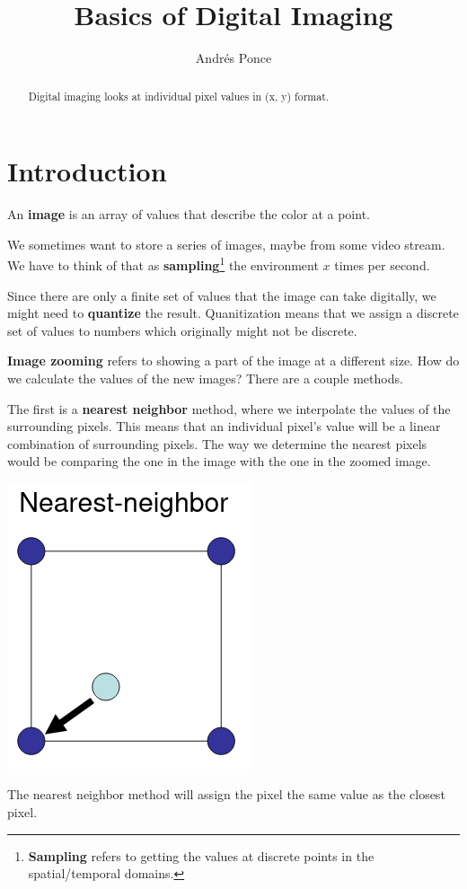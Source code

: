\documentclass{tufte-handout}
\title{Basics of Digital Imaging}
\author{Andr\'es Ponce}
\begin{document}
\maketitle
\begin{abstract}
	Digital imaging looks at individual pixel values in (x, y) format.
\end{abstract}

\section{Introduction}
An \textbf{image} is an array of values that describe the color at a point.

We sometimes want to store a series of images, maybe from some video stream.
We have to think of that as \textbf{sampling}\footnote{\textbf{Sampling} refers to 
getting the values at discrete points in the spatial/temporal domains.} 
the environment $x$ times per second.

Since there are only a finite set of values that the image can take digitally,
we might need to \textbf{quantize} the result. Quanitization means that we assign
a discrete set of values to numbers which originally might not be discrete.

\textbf{Image zooming} refers to showing a part of the image at a different size.
How do we calculate the values of the new images? There are a couple methods.

The first is a \textbf{nearest neighbor} method, where we interpolate the values 
of the surrounding pixels. This means that an individual pixel's value will be 
a linear combination of surrounding pixels. The way we determine the nearest 
pixels would be comparing the one in the image with the one in the zoomed 
image.

\begin{marginfigure}
	\includegraphics[scale=0.3]{nn}
	\caption{The nearest neighbor method will assign the pixel the same value
			as the closest pixel.}
\end{marginfigure}
\end{document}
